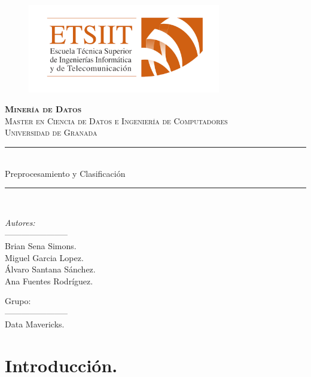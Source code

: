\documentclass[12pt,letterpaper]{article}
\author{Brian Sena Simons} %
\date{\normalsize\today} %
\newcommand{\horrule}[1]{\rule{\linewidth}{#1}} %
\begin{document}
%
\begin{titlepage}
\begin{figure}[H]
    \vspace{-1.3cm}
    \begin{center}
        \includegraphics[width=0.75\textwidth]{Etsiit}
    \end{center}
\end{figure}
\vspace{1.3cm}
\centering
\normalfont \normalsize
\textsc{\textbf{Minería de Datos} \\ \vspace{.15cm} Master en Ciencia de Datos e Ingeniería de Computadores \\ \vspace{.15cm} Universidad de Granada} \\ [25pt] %
    \horrule{0.5pt} \\[0.4cm] %
    \huge Preprocesamiento y Clasificación\\ %
    \horrule{2pt} \\[0.5cm] %

\begin{minipage}{0.4\textwidth}
    \begin{flushleft}\large
        \emph{Autores:} \\
         ----------------------- \\
        \vspace{.15cm}
        Brian Sena Simons. \\
        Miguel Garcia Lopez. \\
        Álvaro Santana Sánchez. \\ 
        Ana Fuentes Rodríguez.

    \end{flushleft}
\end{minipage}
\begin{minipage}{0.4\textwidth}
    \vspace{-2.2cm}
     \begin{flushright}\large
         Grupo: \\
         ----------------------- \\
         Data Mavericks.
    \end{flushright}
\end{minipage}
\end{titlepage}


\hypertarget{Indice}{}
\tableofcontents
\newpage
\section{Introducción.}
\printbibliography
\end{document}
